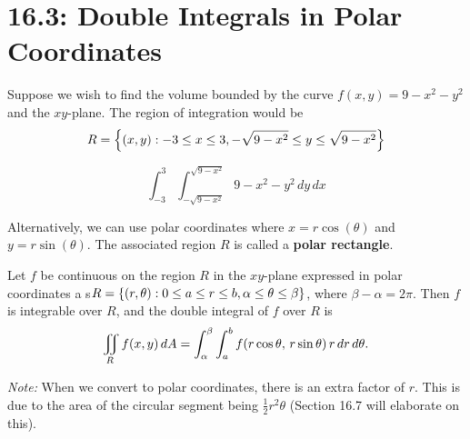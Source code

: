 \documentclass[mathNotesPreamble]{subfiles}
\begin{document}
\section{16.3: Double Integrals in Polar Coordinates}

  Suppose we wish to find the volume bounded by the curve $f(x,y)=9-x^2-y^2$ and the $xy$-plane. The region of integration would be 
    \[R={\left\{(x,y): -3\leq x\leq 3, -\sqrt{9-x^2}\leq y\leq \sqrt{9-x^2}\right\}}\]

    \noindent
    \begin{minipage}{0.5\linewidth}
      \[\int_{-3}^{3}\int_{-\sqrt{9-x^2}}^{\sqrt{9-x^2}} 9-x^2-y^2\,dy\,dx\]
    \end{minipage}%
    \begin{minipage}{0.5\linewidth}
      \begin{flushright}
      \end{flushright}
    \end{minipage}%

  \noindent
  Alternatively, we can use polar coordinates where $x=r\cos(\theta)$ and $y=r\sin(\theta)$. The associated region $R$ is called a \textbf{polar rectangle}.

  \begin{thmBox*}
    Let $f$ be continuous on the region $R$ in the $xy$-plane expressed in polar coordinates a s$R={\left\{(r,\theta): 0\leq a\leq r\leq b, \alpha\leq\theta\leq \beta\right\}}$, where $\beta-\alpha=2\pi$. Then $f$ is integrable over $R$, and the double integral of $f$ over $R$ is
      \[\iint\limits_R f(x,y)\,dA=\int_\alpha^\beta \int_a^b f{\left(r\cos\theta,\, r\sin\theta\right)}\,r\,dr\,d\theta.\]
  \end{thmBox*}
  \textit{Note:} When we convert to polar coordinates, there is an extra factor of $r$. This is due to the area of the circular segment being $\frac{1}{2}r^2\theta$ (Section 16.7 will elaborate on this).
  \pagebreak
\end{document}
